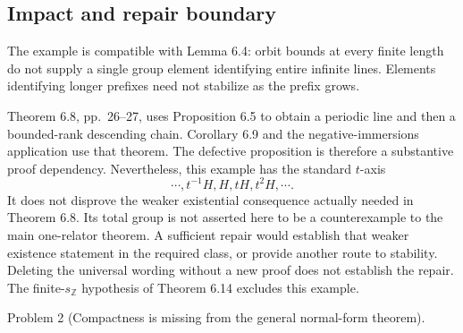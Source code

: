 \documentclass[10pt]{article}
\begin{document}
\subsection*{Impact and repair boundary}
The example is compatible with Lemma 6.4: orbit bounds at every finite length do not supply a single group element identifying entire infinite lines. Elements identifying longer prefixes need not stabilize as the prefix grows.\par
Theorem 6.8, pp. 26–27, uses Proposition 6.5 to obtain a periodic line and then a bounded-rank descending chain. Corollary 6.9 and the negative-immersions application use that theorem. The defective proposition is therefore a substantive proof dependency. Nevertheless, this example has the standard \(t\)-axis \[\cdots,t^{-1}H,H,tH,t^2H,\cdots .\] It does not disprove the weaker existential consequence actually needed in Theorem 6.8. Its total group is not asserted here to be a counterexample to the main one-relator theorem. A sufficient repair would establish that weaker existence statement in the required class, or provide another route to stability. Deleting the universal wording without a new proof does not establish the repair. The finite-\(s_{\mathbb Z}\) hypothesis of Theorem 6.14 excludes this example.\par
Problem 2 (Compactness is missing from the general normal-form theorem).\par
\end{document}
